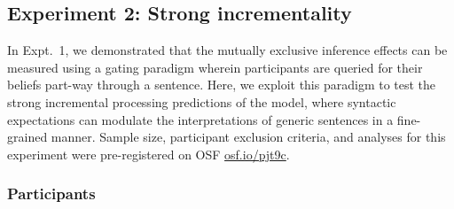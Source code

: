 \documentclass[10pt,letterpaper]{article}
\begin{document}
%
%







\subsection{Experiment 2: Strong incrementality}

In Expt.~1, we demonstrated that the mutually exclusive inference effects can be measured using a gating paradigm wherein participants are queried for their beliefs part-way through a sentence. 
Here, we exploit this paradigm to test the strong incremental processing predictions of the model, where syntactic expectations can modulate the interpretations of generic sentences in a fine-grained manner. 
Sample size, participant exclusion criteria, and analyses for this experiment were pre-registered on OSF \url{osf.io/pjt9c}.

\subsubsection{Participants}
\end{document}
